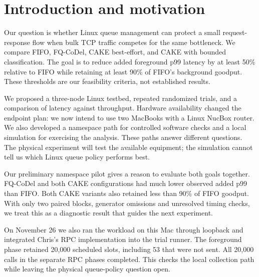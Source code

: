 \section{Introduction and motivation}
Our question is whether Linux queue management can protect a small
request-response flow when bulk TCP traffic competes for the same bottleneck.
We compare FIFO, FQ-CoDel, CAKE best-effort, and CAKE with bounded classification.
The goal is to reduce added foreground p99 latency by at least 50\% relative
to FIFO while retaining at least 90\% of FIFO's background goodput.
These thresholds are our feasibility criteria, not established results.

We proposed a three-node Linux testbed, repeated randomized trials, and a
comparison of latency against throughput. Hardware availability changed the
endpoint plan: we now intend to use two MacBooks with a Linux NucBox router.
We also developed a namespace path for controlled software checks and a local
simulation for exercising the analysis. These paths answer different questions.
The physical experiment will test the available equipment; the simulation
cannot tell us which Linux queue policy performs best.

Our preliminary namespace pilot gives a reason to evaluate both goals together.
FQ-CoDel and both CAKE configurations had much lower observed added p99 than
FIFO. Both CAKE variants also retained less than 90\% of FIFO goodput. With only
two paired blocks, generator omissions and unresolved timing checks, we treat
this as a diagnostic result that guides the next experiment.

On November 26 we also ran the workload on this Mac through loopback and
integrated Chris's RPC implementation into the trial runner. The foreground
phase retained 20,000 scheduled slots, including 53 that were not sent. All
20,000 calls in the separate RPC phases completed. This checks the local
collection path while leaving the physical queue-policy question open.
